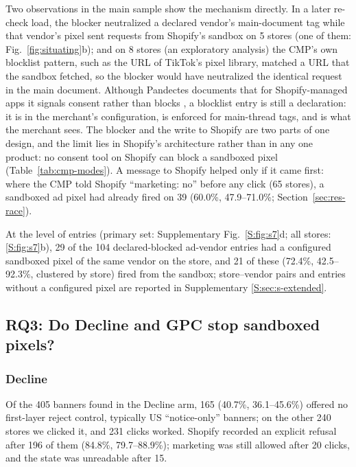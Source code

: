 Two observations in the main sample show the mechanism directly. In a later re-check load, the blocker neutralized a declared vendor's main-document tag while that vendor's pixel sent requests from Shopify's sandbox on 5 stores (one of them: Fig.~\ref{fig:situating}b); and on 8 stores (an exploratory analysis) the CMP's own blocklist pattern, such as the URL of TikTok's pixel library, matched a URL that the sandbox fetched, so the blocker would have neutralized the identical request in the main document. Although Pandectes documents that for Shopify-managed apps it signals consent rather than blocks \citep{pandectes_blocking}, a blocklist entry is still a declaration: it is in the merchant's configuration, is enforced for main-thread tags, and is what the merchant sees. The blocker and the write to Shopify are two parts of one design, and the limit lies in Shopify's architecture rather than in any one product: no consent tool on Shopify can block a sandboxed pixel (Table~\ref{tab:cmp-modes}). A message to Shopify helped only if it came first: where the CMP told Shopify ``marketing: no'' before any click (65 stores), a sandboxed ad pixel had already fired on 39 (60.0\%, 47.9--71.0\%; Section~\ref{sec:res-race}).

At the level of entries (primary set: Supplementary Fig.~\ref*{S:fig:s7}d; all stores: \ref*{S:fig:s7}b), 29 of the 104 declared-blocked ad-vendor entries had a configured sandboxed pixel of the same vendor on the store, and 21 of these (72.4\%, 42.5--92.3\%, clustered by store) fired from the sandbox; store--vendor pairs and entries without a configured pixel are reported in Supplementary \ref*{S:sec:s-extended}.

\subsection{RQ3: Do Decline and GPC stop sandboxed pixels?}\label{sec:res-choices}

\subsubsection{Decline}\label{sec:res-decline}

Of the 405 banners found in the Decline arm, 165 (40.7\%, 36.1--45.6\%) offered no first-layer reject control, typically US ``notice-only'' banners; on the other 240 stores we clicked it, and 231 clicks worked. Shopify recorded an explicit refusal after 196 of them (84.8\%, 79.7--88.9\%); marketing was still allowed after 20 clicks, and the state was unreadable after 15.


